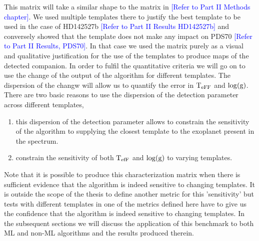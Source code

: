 This matrix will take a similar shape to the matrix in \textcolor{blue}{[Refer to Part II Methods chapter]}. 
We used multiple templates there to justify the best template to be used in the case of HD142527b \textcolor{blue}{[Refer to Part II Results HD142527b]} and conversely showed that the template does not make any impact on PDS70 \textcolor{blue}{[Refer to Part II Results, PDS70]}.
In that case we used the matrix purely as a visual and qualitative justification for the use of the templates to produce maps of the detected companion.
In order to fulfil the quantitative criteria we will go on to use the change of the output of the algorithm for different templates.
The dispersion of the changw will allow us to quantify the error in $\rm{T_{eFF}}$ and $\rm{\log(g)}$.
There are two basic reasons to use the dispersion of the detection parameter across different templates,
\begin{enumerate}
    \item this dispersion of the detection parameter allows to constrain the sensitivity of the algorithm to supplying the closest template to the exoplanet present in the spectrum.
    \item constrain the sensitivity of both $\rm{T_{efF}}$ and $\rm{\log(g)}$ to varying templates.
\end{enumerate}
Note that it is possible to produce this characterization matrix when there is sufficient evidence that the algorithm is indeed sensitive to changing templates.
It is outside the scope of the thesis to define another metric for this 'sensitivity' but tests with different templates in one of the metrics defined here have to give us the confidence that the algorithm is indeed sensitive to changing templates.
In the subsequent sections we will discuss the application of this benchmark to both ML and non-ML algorithms and the results produced therein.


